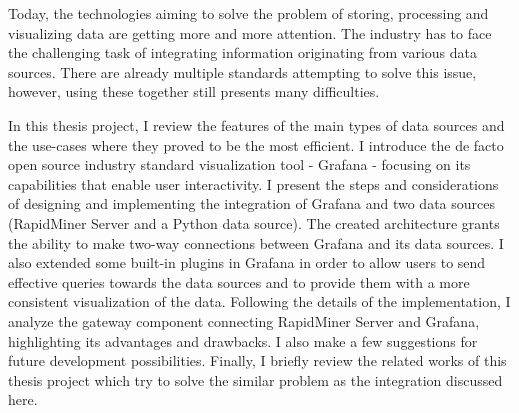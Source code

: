 Today, the technologies aiming to solve the problem of storing, processing and visualizing data are getting more and more attention. The industry has to face the challenging task of integrating information originating from various data sources. There are already multiple standards attempting to solve this issue, however, using these together still presents many difficulties.

In this thesis project, I review the features of the main types of data sources and the use-cases where they proved to be the most efficient. I introduce the de facto open source industry standard visualization tool - Grafana - focusing on its capabilities that enable user interactivity. I present the steps and considerations of designing and implementing the integration of Grafana and two data sources (RapidMiner Server and a Python data source). The created architecture grants the ability to make two-way connections between Grafana and its data sources. I also extended some built-in plugins in Grafana in order to allow users to send effective queries towards the data sources and to provide them with a more consistent visualization of the data. Following the details of the implementation, I analyze the gateway component connecting RapidMiner Server and Grafana, highlighting its advantages and drawbacks. I also make a few suggestions for future development possibilities. Finally, I briefly review the related works of this thesis project which try to solve the similar problem as the integration discussed here.


\vfill
\selectthesislanguage

\setcounter{romanPage}{\value{page}}
